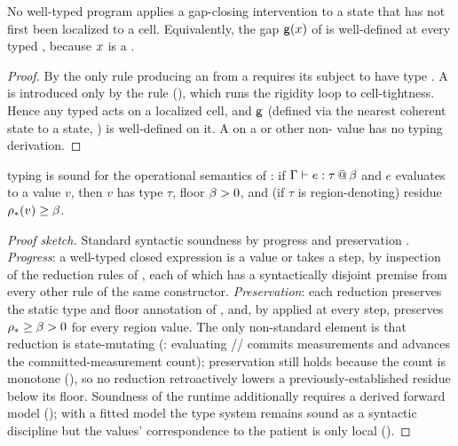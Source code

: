 \begin{theorem}
\label{cfc:thm:no-blind-therapy}
No well-typed  program applies a gap-closing intervention to a state
that has not first been localized to a cell. Equivalently, the gap
$\mathsf{g}(x)$ of  is well-defined at every typed , because
$x$ is a .
\end{theorem}

\begin{proof}
By  the only rule producing an  from a
 requires its subject to have type . A  is
introduced only by the  rule (), which runs
the rigidity loop to cell-tightness. Hence any typed  acts on a
localized cell, and $\mathsf{g}$ (defined via the nearest coherent state to a state,
) is well-defined on it. A  on a  or other
non- value has no typing derivation.
\end{proof}

\begin{theorem}
\label{cfc:thm:soundness}
 typing is sound for the operational semantics of : if
$\Gamma\vdash e:\tau\,@\,\beta$ and $e$ evaluates to a value $v$, then $v$ has
type $\tau$, floor $\beta>0$, and (if $\tau$ is region-denoting) residue
$\rho_{\ast}(v)\ge\beta$.
\end{theorem}

\begin{proof}[Proof sketch]
Standard syntactic soundness by progress and preservation
\citep{wright1994syntactic,pierce2002types}. \emph{Progress}: a well-typed
closed expression is a value or takes a step, by inspection of the reduction
rules of , each of which has a syntactically disjoint premise
from every other rule of the same constructor. \emph{Preservation}: each
reduction preserves the static type and floor annotation of
, and, by  applied at every step,
preserves $\rho_{\ast}\ge\beta>0$ for every region value. The only non-standard
element is that reduction is state-mutating (: evaluating
// commits measurements and advances the
committed-measurement count); preservation still holds because the count is
monotone (), so no reduction retroactively lowers a
previously-established residue below its floor. Soundness of the runtime
additionally requires a derived forward model (); with a
fitted model the type system remains sound as a syntactic discipline but the
values' correspondence to the patient is only local ().
\end{proof}

